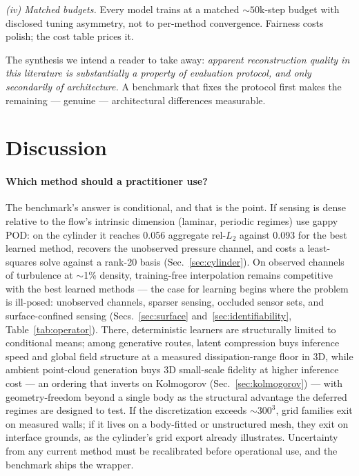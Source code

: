 \documentclass[aip,pof,reprint,amsmath,amssymb,superscriptaddress]{revtex4-1}
\begin{document}
\emph{(iv) Matched budgets.} Every model trains at a matched
${\sim}50$k-step budget with disclosed tuning asymmetry, not to per-method
convergence. Fairness costs polish; the cost table prices it.

The synthesis we intend a reader to take away: \emph{apparent reconstruction
quality in this literature is substantially a property of evaluation
protocol, and only secondarily of architecture.} A benchmark that fixes the
protocol first makes the remaining --- genuine --- architectural differences
measurable.

\section{Discussion}\label{sec:discussion}

\paragraph{Which method should a practitioner use?} The benchmark's answer is
conditional, and that is the point. If sensing is dense relative to the
flow's intrinsic dimension (laminar, periodic regimes) use gappy POD: on the
cylinder it reaches 0.056 aggregate rel-$L_2$ against 0.093 for the best
learned method, recovers the unobserved pressure channel, and costs a
least-squares solve against a rank-20 basis (Sec.~\ref{sec:cylinder}). On observed channels of turbulence at
${\sim}$1\% density, training-free interpolation remains competitive with the
best learned methods --- the case for learning begins where the problem is
ill-posed: unobserved channels, sparser sensing, occluded sensor sets, and
surface-confined sensing (Secs.~\ref{sec:surface}
and~\ref{sec:identifiability}, Table~\ref{tab:operator}). There, deterministic learners
are structurally limited to conditional means; among generative routes,
latent compression buys inference speed and global field structure at a
measured dissipation-range floor in 3D, while ambient point-cloud generation
buys 3D small-scale fidelity at higher inference cost --- an ordering that
inverts on Kolmogorov (Sec.~\ref{sec:kolmogorov}) --- with geometry-freedom
beyond a single body as the structural advantage the deferred regimes are
designed to test. If the discretization exceeds ${\sim}300^3$, grid families
exit on measured walls; if it lives on a body-fitted or unstructured mesh,
they exit on interface grounds, as the cylinder's grid export already
illustrates. Uncertainty from any
current method must be recalibrated before operational use, and the benchmark
ships the wrapper.
\end{document}
